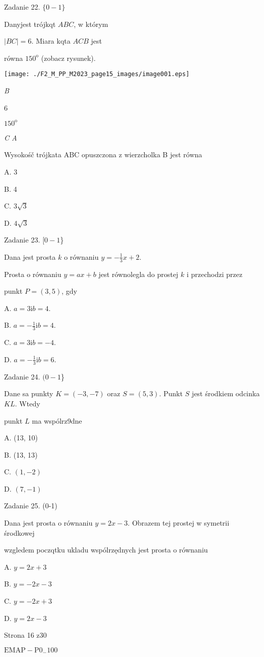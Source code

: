 \documentclass[a4paper,12pt]{article}
\begin{document}
Zadanie 22. $\{0-1\}$

Danyjest trójkqt $ABC$, w którym

$|BC|=6$. Miara kqta $ACB$ jest

równa $150^{\mathrm{o}}$ (zobacz rysunek).
\begin{center}
\texttt{[image: ./F2\_M\_PP\_M2023\_page15\_images/image001.eps]}
\end{center}
{\it B}

6

$150^{\mathrm{o}}$

{\it C  A}

Wysokośč trójkata ABC opuszczona z wierzcholka B jest równa

A. 3

B. 4

C. $3\sqrt{3}$

D. $4\sqrt{3}$

Zadanie 23. $[0-1$\}

Dana jest prosta $k$ o równaniu $y=-\displaystyle \frac{1}{3}x+2.$

Prosta o równaniu $y=ax+b$ jest równolegla do prostej $k$ i przechodzi przez

punkt $P=(3,5)$, gdy

A. $a=3 \mathrm{i} b=4.$

B. $a=-\displaystyle \frac{1}{3} \mathrm{i} b=4.$

C. $a=3 \mathrm{i} b=-4.$

D. $a=-\displaystyle \frac{1}{3} \mathrm{i} b=6.$

Zadanie 24. $(0-1$\}

Dane sa punkty $K=(-3,-7)$ oraz $S=(5,3)$. Punkt $S$ jest środkiem odcinka $KL$. Wtedy

punkt $L$ ma wspólrz9dne

A. (13, 10)

B. (13, 13)

C. $(1,-2)$

D. $(7,-1)$

Zadanie 25. (0-1)

Dana jest prosta o równaniu $y=2x-3$. Obrazem tej prostej w symetrii środkowej

wzgledem poczqtku ukladu wspólrzędnych jest prosta o równaniu

A. $y=2x+3$

B. $y=-2x-3$

C. $y=-2x+3$

D. $y=2x-3$

Strona 16 z30

$\mathrm{E}\mathrm{M}\mathrm{A}\mathrm{P}-\mathrm{P}0_{-}100$
\end{document}
